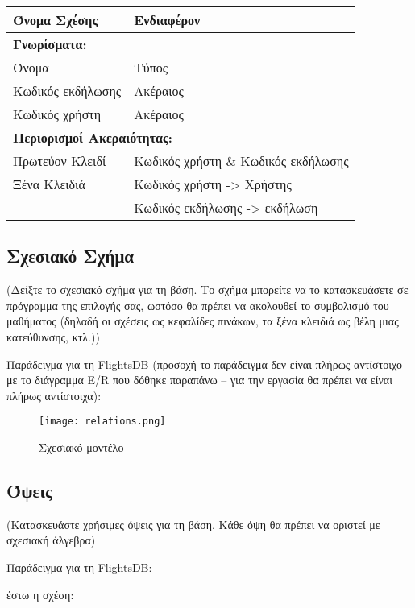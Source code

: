 \begin{tabular}{|p{6cm}|p{8cm}|}
  \hline
  Όνομα Σχέσης      & Ενδιαφέρον                           \\ \hline
  \multicolumn{2}{|l|}{\textbf{Γνωρίσματα:}}               \\ \hline
  Όνομα             & Τύπος                                \\ \hline
  Κωδικός εκδήλωσης & Ακέραιος                             \\ \hline
  Κωδικός χρήστη    & Ακέραιος                             \\ \hline
  \multicolumn{2}{|l|}{\textbf{Περιορισμοί Ακεραιότητας:}} \\ \hline
  Πρωτεύον Κλειδί   & Κωδικός χρήστη \& Κωδικός εκδήλωσης  \\ \hline
  Ξένα Κλειδιά      & Κωδικός χρήστη -> Χρήστης            \\ \hline
                    & Κωδικός εκδήλωσης -> εκδήλωση        \\ \hline
\end{tabular}



\subsection{Σχεσιακό Σχήμα}

(Δείξτε το σχεσιακό σχήμα για τη βάση. Το σχήμα μπορείτε να το
κατασκευάσετε σε πρόγραμμα της επιλογής σας, ωστόσο θα πρέπει να
ακολουθεί το συμβολισμό του μαθήματος (δηλαδή οι σχέσεις ως κεφαλίδες
πινάκων, τα ξένα κλειδιά ως βέλη μιας κατεύθυνσης, κτλ.))

Παράδειγμα για τη FlightsDB (προσοχή το παράδειγμα δεν είναι πλήρως
αντίστοιχο με το διάγραμμα E/R που δόθηκε παραπάνω – για την εργασία
θα πρέπει να είναι πλήρως αντίστοιχα):

\begin{figure}[H]
  \centering
  \texttt{[image: relations.png]}
  \caption{Σχεσιακό μοντέλο}
\end{figure}

\subsection{Όψεις}
(Κατασκευάστε χρήσιμες όψεις για τη βάση. Κάθε όψη θα πρέπει να
οριστεί με σχεσιακή άλγεβρα)

Παράδειγμα για τη FlightsDB:

έστω η σχέση:

